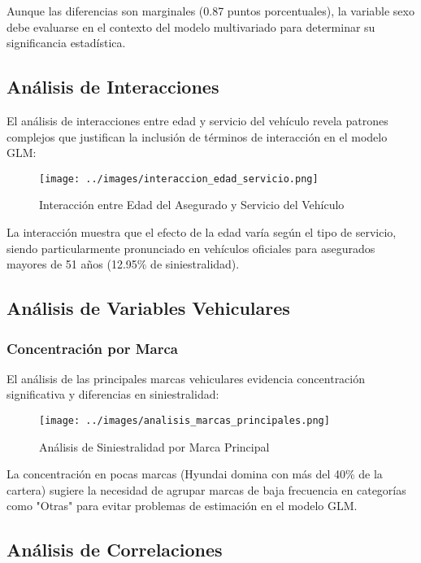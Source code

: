 Aunque las diferencias son marginales (0.87 puntos porcentuales), la variable sexo debe evaluarse en el contexto del modelo multivariado para determinar su significancia estadística.

\subsection{Análisis de Interacciones}

El análisis de interacciones entre edad y servicio del vehículo revela patrones complejos que justifican la inclusión de términos de interacción en el modelo GLM:

\begin{figure}[H]
\centering
\texttt{[image: ../images/interaccion\_edad\_servicio.png]}
\caption{Interacción entre Edad del Asegurado y Servicio del Vehículo}
\end{figure}

La interacción muestra que el efecto de la edad varía según el tipo de servicio, siendo particularmente pronunciado en vehículos oficiales para asegurados mayores de 51 años (12.95\% de siniestralidad).

\subsection{Análisis de Variables Vehiculares}

\subsubsection{Concentración por Marca}

El análisis de las principales marcas vehiculares evidencia concentración significativa y diferencias en siniestralidad:

\begin{figure}[H]
\centering
\texttt{[image: ../images/analisis\_marcas\_principales.png]}
\caption{Análisis de Siniestralidad por Marca Principal}
\end{figure}

La concentración en pocas marcas (Hyundai domina con más del 40\% de la cartera) sugiere la necesidad de agrupar marcas de baja frecuencia en categorías como "Otras" para evitar problemas de estimación en el modelo GLM.

\subsection{Análisis de Correlaciones}

